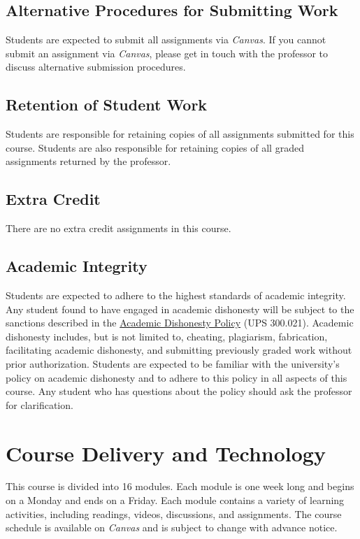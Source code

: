 \documentclass[12pt, letterpaper]{article}
\begin{document}
\subsection*{Alternative Procedures for Submitting Work}
Students are expected to submit all assignments via \emph{Canvas}. If you cannot submit an assignment via \emph{Canvas}, please get in touch with the professor to discuss alternative submission procedures.

\subsection*{Retention of Student Work}
Students are responsible for retaining copies of all assignments submitted for this course. Students are also responsible for retaining copies of all graded assignments returned by the professor.

\subsection*{Extra Credit}
There are no extra credit assignments in this course. 

\subsection*{Academic Integrity}
Students are expected to adhere to the highest standards of academic integrity. Any student found to have engaged in academic dishonesty will be subject to the sanctions described in the \href{https://www.fullerton.edu/senate/publications_policies_resolutions/ups/UPS%20300/UPS%20300.021.pdf}{Academic Dishonesty Policy} (UPS 300.021). Academic dishonesty includes, but is not limited to, cheating, plagiarism, fabrication, facilitating academic dishonesty, and submitting previously graded work without prior authorization. Students are expected to be familiar with the university's policy on academic dishonesty and to adhere to this policy in all aspects of this course. Any student who has questions about the policy should ask the professor for clarification.

\section*{Course Delivery and Technology}

This course is divided into 16 modules. Each module is one week long and begins on a Monday and ends on a Friday. Each module contains a variety of learning activities, including readings, videos, discussions, and assignments. The course schedule is available on \emph{Canvas} and is subject to change with advance notice.
\end{document}
